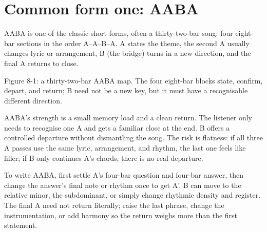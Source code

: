 \section{Common form one: AABA}

AABA is one of the classic short forms, often a thirty-two-bar song: four eight-bar sections in the order A--A--B--A. A states the theme, the second A usually changes lyric or arrangement, B (the bridge) turns in a new direction, and the final A returns to close.

\begin{center}
\begin{minipage}{0.94\linewidth}
\centering
{}

Figure 8-1: a thirty-two-bar AABA map. The four eight-bar blocks state, confirm, depart, and return; B need not be a new key, but it must have a recognisable different direction.
\end{minipage}
\end{center}

AABA's strength is a small memory load and a clean return. The listener only needs to recognise one A and gets a familiar close at the end. B offers a controlled departure without dismantling the song. The risk is flatness: if all three A passes use the same lyric, arrangement, and rhythm, the last one feels like filler; if B only continues A's chords, there is no real departure.

To write AABA, first settle A's four-bar question and four-bar answer, then change the answer's final note or rhythm once to get A'. B can move to the relative minor, the subdominant, or simply change rhythmic density and register. The final A need not return literally; raise the last phrase, change the instrumentation, or add harmony so the return weighs more than the first statement.

